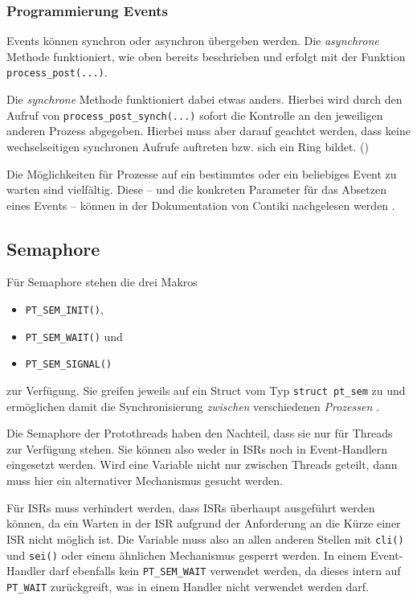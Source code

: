 \subsubsection{Programmierung Events}
	Events können synchron oder asynchron übergeben werden.  Die
	\emph{asynchrone} Methode funktioniert, wie oben bereits beschrieben
	und erfolgt mit der Funktion \lstinline=process_post(...)=.

	Die \emph{synchrone} Methode funktioniert dabei etwas anders.  Hierbei
	wird durch den Aufruf von \lstinline=process_post_synch(...)= sofort
	die Kontrolle an den jeweiligen anderen Prozess abgegeben.  Hierbei muss
	aber darauf geachtet werden, dass keine wechselseitigen synchronen
	Aufrufe auftreten bzw. sich ein Ring bildet. ()
	

	Die Möglichkeiten für Prozesse auf ein bestimmtes oder ein beliebiges
	Event zu warten sind vielfältig.  Diese -- und die konkreten
	Parameter für das Absetzen eines Events -- können in der Dokumentation
	von Contiki nachgelesen werden
	\parencite[siehe][Contiki processes]{Contiki:Doc}.


\subsection{Semaphore}
	Für Semaphore stehen die drei Makros
	\begin{itemize}
	\item	\lstinline=PT_SEM_INIT()=,
	\item	\lstinline=PT_SEM_WAIT()= und
	\item	\lstinline=PT_SEM_SIGNAL()=
	\end{itemize}
	zur Verfügung.  Sie greifen jeweils auf ein Struct vom Typ
	\lstinline=struct pt_sem= zu und ermöglichen damit die Synchronisierung
	\emph{zwischen} verschiedenen \emph{Prozessen}
	\parencite[siehe][Protothreads semaphores]{Contiki:Doc}.

	Die Semaphore der Protothreads haben den Nachteil, dass sie nur für
	Threads zur Verfügung stehen.	Sie können also weder in \acp{ISR}
	noch in Event-Handlern eingesetzt werden.  Wird eine Variable nicht nur
	zwischen Threads geteilt, dann muss hier ein alternativer Mechanismus
	gesucht werden.

	Für \acp{ISR} muss verhindert werden, dass \acp{ISR} überhaupt
	ausgeführt werden können, da ein Warten in der \ac{ISR} aufgrund der
	Anforderung an die Kürze einer \ac{ISR} nicht möglich ist.  Die Variable
	muss also an allen anderen Stellen mit \lstinline=cli()= und
	\lstinline=sei()= oder einem ähnlichen Mechanismus gesperrt werden.
	In einem Event-Handler darf ebenfalls kein \lstinline=PT_SEM_WAIT=
	verwendet werden, da dieses intern auf  \lstinline=PT_WAIT=
	zurückgreift, was in einem Handler nicht verwendet werden darf.

